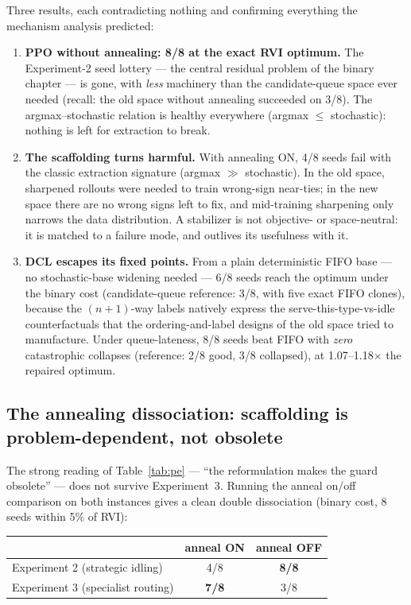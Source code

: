 \documentclass[11pt,a4paper]{article}
\begin{document}
Three results, each contradicting nothing and confirming everything the
mechanism analysis predicted:

\begin{enumerate}
  \item \textbf{PPO without annealing: 8/8 at the exact RVI optimum.}
  The Experiment-2 seed lottery --- the central residual problem of the
  binary chapter --- is gone, with \emph{less} machinery than the
  candidate-queue space ever needed (recall: the old space without
  annealing succeeded on 3/8).  The argmax--stochastic relation is
  healthy everywhere (argmax $\le$ stochastic): nothing is left for
  extraction to break.
  \item \textbf{The scaffolding turns harmful.}  With annealing ON, 4/8
  seeds fail with the classic extraction signature (argmax $\gg$
  stochastic).  In the old space, sharpened rollouts were needed to
  train wrong-sign near-ties; in the new space there are no wrong signs
  left to fix, and mid-training sharpening only narrows the data
  distribution.  A stabilizer is not objective- or space-neutral: it is
  matched to a failure mode, and outlives its usefulness with it.
  \item \textbf{DCL escapes its fixed points.}  From a plain
  deterministic FIFO base --- no stochastic-base widening needed ---
  6/8 seeds reach the optimum under the binary cost (candidate-queue
  reference: 3/8, with five exact FIFO clones), because the
  $(n{+}1)$-way labels natively express the serve-this-type-vs-idle
  counterfactuals that the ordering-and-label designs of the old space
  tried to manufacture.  Under queue-lateness, 8/8 seeds beat FIFO with
  \emph{zero} catastrophic collapses (reference: 2/8 good, 3/8
  collapsed), at 1.07--1.18$\times$ the repaired optimum.
\end{enumerate}

\subsection{The annealing dissociation: scaffolding is
problem-dependent, not obsolete}
\label{sec:pe-anneal}

The strong reading of Table~\ref{tab:pe} --- ``the reformulation makes
the guard obsolete'' --- does not survive Experiment~3.  Running the
anneal on/off comparison on both instances gives a clean double
dissociation (binary cost, 8 seeds within 5\% of RVI):

\begin{center}
\begin{tabular}{lcc}
\toprule
 & anneal ON & anneal OFF \\
\midrule
Experiment 2 (strategic idling) & 4/8 & \textbf{8/8} \\
Experiment 3 (specialist routing) & \textbf{7/8} & 3/8 \\
\bottomrule
\end{tabular}
\end{center}
\end{document}
